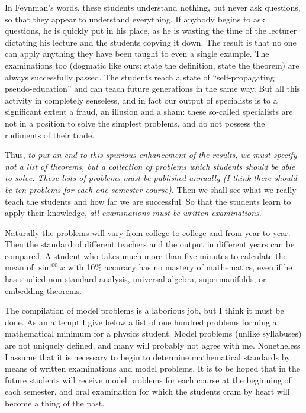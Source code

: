 \documentclass{article}
\begin{document}
In Feynman's words, these students understand nothing, but never ask questions,
so that they appear to understand everything. If anybody begins to ask
questions, he is quickly put in his place, as he is wasting the time of the
lecturer dictating his lecture and the students copying it down. The result is
that no one can apply anything they have been taught to even a single example.
The examinations too (dogmatic like ours: state the definition, state the
theorem) are always successfully passed. The students reach a state of
``self-propagating pseudo-education'' and can teach future generations in the
same way. But all this activity in completely senseless, and in fact our output
of specialists is to a significant extent a fraud, an illusion and a sham: these
so-called specialists are not in a position to solve the simplest problems, and
do not possess the rudiments of their trade.

Thus, \emph{to put an end to this spurious enhancement of the results, we must
  specify not a list of theorems, but a collection of problems which students
  should be able to solve. These lists of problems must be published annually (I
  think there should be ten problems for each one-semester course).} Then we
shall see what we really teach the students and how far we are successful. So
that the students learn to apply their knowledge, \emph{all examinations must be
  written examinations}.

Naturally the problems will vary from college to college and from year to year.
Then the standard of different teachers and the output in different years can be
compared. A student who takes much more than five minutes to calculate the mean
of $\sin^{100}x$ with 10\% accuracy has no mastery of mathematics, even if he
has studied non-standard analysis, universal algebra, supermanifolds, or
embedding theorems.

The compilation of model problems is a laborious job, but I think it must be
done. As an attempt I give below a list of one hundred problems forming a
mathematical minimum for a physics student. Model problems (unlike syllabuses)
are not uniquely defined, and many will probably not agree with me. Nonetheless
I assume that it is necessary to begin to determine mathematical standards by
means of written examinations and model problems. It is to be hoped that in the
future students will receive model problems for each course at the beginning of
each semester, and oral examination for which the students cram by heart will
become a thing of the past.
\end{document}
